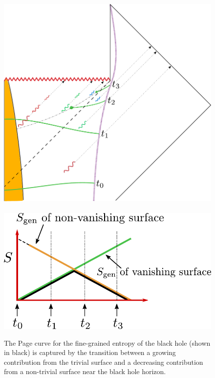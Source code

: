 \begin{figure}[t]
\begin{center}
\includegraphics[scale=0.39]{figures/surfacetransition.pdf}
 \ \ \ \ \ \ \includegraphics[scale=0.56]{figures/bothcurves.pdf}
\caption{The Page curve for the fine-grained entropy  of the black hole  (shown in black) is captured by the transition between a growing contribution from the trivial surface and a decreasing contribution from a non-trivial surface near the black hole horizon.}
\label{both}
\end{center}
\end{figure}





 
  

